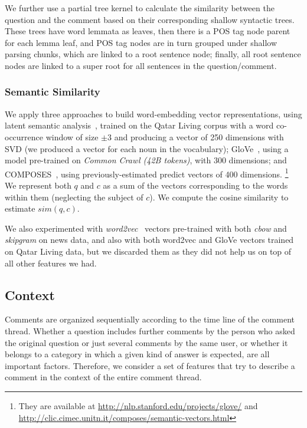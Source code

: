 We further use a partial tree kernel \cite{Moschitti:2006}
to calculate the similarity between the question and the comment
based on their corresponding shallow syntactic trees.
These trees have word lemmata as leaves,
then there is a POS tag node parent for each lemma leaf,
and POS tag nodes are in turn grouped under shallow parsing chunks,
which are linked to a root sentence node;
finally, all root sentence nodes
are linked to a super root for all sentences in the question/comment.


\subsubsection{Semantic Similarity}
\label{sub:semantic}

We apply three approaches to build word-embedding vector representations,
using
\Ni latent semantic analysis~\cite{croce-previtali:2010:GEMS}, 
trained on the Qatar Living corpus with a word co-occurrence window of size 
$\pm3$ and producing a vector of 250 dimensions with SVD
(we produced a vector for each noun in the vocabulary); 
\Nii GloVe~\cite{Pennington:2014}, using a model pre-trained on \textit{Common 
Crawl (42B tokens)}, with 300 dimensions; and 
\Niii COMPOSES~\cite{Baroni:2014}, using previously-estimated predict vectors of 
400 dimensions.%
\footnote{They are available at \url{http://nlp.stanford.edu/projects/glove/} 
and \url{http://clic.cimec.unitn.it/composes/semantic-vectors.html}}
We represent both $q$ and $c$ as 
a sum of the vectors corresponding to the words within them (neglecting the 
subject of $c$). We compute the cosine similarity to estimate $sim(q,c)$. 

We also experimented with \textit{word2vec}~\cite{Mikolov:2013} vectors 
pre-trained with both \emph{cbow} and \emph{skipgram} on news data, 
and also with both word2vec and GloVe vectors trained on Qatar Living data,
but we discarded them as they did not help us on top of all other features we had.

\subsection{Context}
\label{ssub:context}

Comments are organized sequentially according to the time line of the comment thread.
Whether a question includes further comments by the person who asked the original question
or just several comments by the same user,
or whether it belongs to a category in which a given kind of answer is expected,
are all important factors.
Therefore, we consider a set of features that try to describe
a comment in the context of the entire comment thread.

